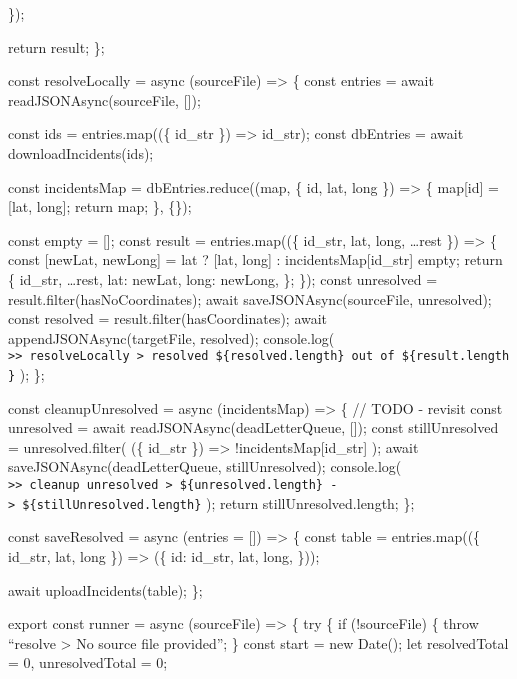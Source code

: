 \documentclass[
]{article}
\begin{document}
\});

return result; \};

const resolveLocally = async (sourceFile) =\textgreater{} \{ const
entries = await readJSONAsync(sourceFile, {[}{]});

const ids = entries.map((\{ id\_str \}) =\textgreater{} id\_str); const
dbEntries = await downloadIncidents(ids);

const incidentsMap = dbEntries.reduce((map, \{ id, lat, long \})
=\textgreater{} \{ map{[}id{]} = {[}lat, long{]}; return map; \}, \{\});

const empty = {[}{]}; const result = entries.map((\{ id\_str, lat, long,
\ldots rest \}) =\textgreater{} \{ const {[}newLat, newLong{]} = lat ?
{[}lat, long{]} : incidentsMap{[}id\_str{]} \textbar\textbar{} empty;
return \{ id\_str, \ldots rest, lat: newLat, long: newLong, \}; \});
const unresolved = result.filter(hasNoCoordinates); await
saveJSONAsync(sourceFile, unresolved); const resolved =
result.filter(hasCoordinates); await appendJSONAsync(targetFile,
resolved); console.log(
\texttt{\textgreater{}\textgreater{}\ resolveLocally\ \textgreater{}\ resolved\ \$\{resolved.length\}\ out\ of\ \$\{result.length\}}
); \};

const cleanupUnresolved = async (incidentsMap) =\textgreater{} \{ //
TODO - revisit const unresolved = await readJSONAsync(deadLetterQueue,
{[}{]}); const stillUnresolved = unresolved.filter( (\{ id\_str \})
=\textgreater{} !incidentsMap{[}id\_str{]} ); await
saveJSONAsync(deadLetterQueue, stillUnresolved); console.log(
\texttt{\textgreater{}\textgreater{}\ cleanup\ unresolved\ \textgreater{}\ \$\{unresolved.length\}\ -\textgreater{}\ \$\{stillUnresolved.length\}}
); return stillUnresolved.length; \};

const saveResolved = async (entries = {[}{]}) =\textgreater{} \{ const
table = entries.map((\{ id\_str, lat, long \}) =\textgreater{} (\{ id:
id\_str, lat, long, \}));

await uploadIncidents(table); \};

export const runner = async (sourceFile) =\textgreater{} \{ try \{ if
(!sourceFile) \{ throw ``resolve \textgreater{} No source file
provided''; \} const start = new Date(); let resolvedTotal = 0,
unresolvedTotal = 0;
\end{document}
